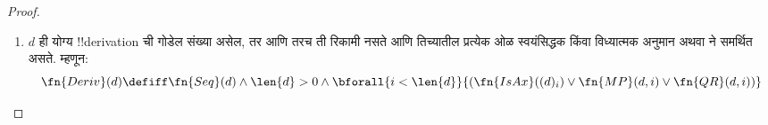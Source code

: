 \documentclass[../../../include/open-logic-section]{subfiles}
\begin{document}
\begin{proof}
\begin{enumerate}
  \begin{enumerate}
  \item एखादे !!a{sentence}~$!B$ असते (येथे हा विशेष प्रसंग;
    सर्वसाधारण नियमात सूत्रही चालते), आणि
  \item $x$ हाच मुक्त चल असू शकणारे !!a{formula}~$!A(x)$ असते, ज्यासाठी
  \item ओळ $i$ मध्ये $!B \lif \lforall[x][!A(x)]$ असते,
  \item आधीच्या एखाद्या ओळीत, $j < i$, कोणत्यातरी अचर~$c$ साठी
    $!B \lif \Subst{!A}{c}{x}$ असते,
  \item आणि हा अचर $!B$ मध्ये येत नाही.
  \end{enumerate}
  या अटी आदिम पुनरावर्ती रीतीने तपासता येतात. कारण $!B$,
  $!A(x)$ आणि $x$ यांच्या गोडेल संख्या $i$ व्या ओळीवरील
  सूत्राच्या गोडेल संख्येपेक्षा लहान आहेत; तसेच $c$ ची गोडेल
  संख्या $j$ व्या ओळीवरील सूत्राच्या गोडेल संख्येपेक्षा लहान आहे:
  \begin{multline*}
    \fn{QR}_1(d, i) \defiff \bexists{j<i}{\bexists{b < (d)_i}{\bexists{x <
        (d)_i}{\bexists{a < (d)_i}{\bexists{c < (d)_j}{(}}}}}
    \\ \fn{Var}(x) \land \fn{Const}(c) \land {} \\
    (d)_i = \Gn{(} \concat
    b \concat \Gn{\lif} \concat \Gn{\lforall} \concat x \concat a
    \concat \Gn{)} \land {}\\
    (d)_j = \Gn{(} \concat b \concat
    \Gn{\lif} \concat \fn{Subst}(a,c,x) \concat \Gn{)} \land {}\\ \fn{Frm}(b)
    \land \fn{Frm}(a) \land {} \bforall{k <
      \len{b}}{(b)_k \neq (c)_0})
  \end{multline*}
  येथे $c$ आणि $x$ यांना अचर आणि चल यांच्या पदरूपातील
  गोडेल संख्या मानले आहे (म्हणजे त्यांचे चिन्हसंकेतांक नाहीत).
  $x$ हा $!A(x)$ मधील आदेशनासाठीचा चल आहे;
  $\Subst{!A(x)}{c}{x}$ हे !!a{sentence} आहे का ही मूळ
  वाक्यांपुरती तपासणी सर्वसाधारण संख्यक-नियमासाठी आवश्यक नाही.
  सूत्ररूपता तपासून, $!B$ मधील प्रत्येक चिन्ह $c$ पेक्षा
  वेगळे आहे ही अट ठेवून $c$ हा $!B$ मध्ये येत नाही,
  याची खात्री करतो.

  \QR{} ची दुसरी आवृत्ती सरावासाठी ठेवतो.
\item $d$ ही योग्य !!{derivation} ची गोडेल संख्या असेल, तर आणि
  तरच ती रिकामी नसते आणि तिच्यातील प्रत्येक ओळ स्वयंसिद्धक
  किंवा विध्यात्मक अनुमान अथवा \QR{} ने समर्थित असते. म्हणून:
  \[
  \fn{Deriv}(d) \defiff \fn{Seq}(d) \land \len{d}>0 \land
  \bforall{i < \len{d}}{(\fn{IsAx}((d)_i) \lor
    \fn{MP}(d,i) \lor \fn{QR}(d, i))}
  \]
\end{enumerate}
\end{proof}
\end{document}
